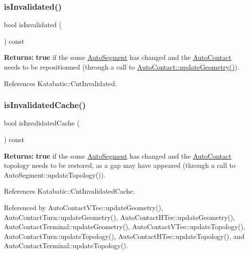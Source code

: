 \subsubsection{\texorpdfstring{is\+Invalidated()}{isInvalidated()}}
{\footnotesize\ttfamily bool is\+Invalidated (\begin{DoxyParamCaption}{ }\end{DoxyParamCaption}) const\hspace{0.3cm}{\ttfamily [inline]}}

{\bfseries Returns\+:} {\bfseries true} if the some \mbox{\hyperlink{classKatabatic_1_1AutoSegment}{Auto\+Segment}} has changed and the \mbox{\hyperlink{classKatabatic_1_1AutoContact}{Auto\+Contact}} needs to be repositionned (through a call to \mbox{\hyperlink{classKatabatic_1_1AutoContact_af6a2454547eeb7f5a519970dcb467e90}{Auto\+Contact\+::update\+Geometry()}}). 

References Katabatic\+::\+Cnt\+Invalidated.

\mbox{\label{classKatabatic_1_1AutoContact_a6d1120fc8800af5d269e72ce5c3ba629}} 
\subsubsection{\texorpdfstring{is\+Invalidated\+Cache()}{isInvalidatedCache()}}
{\footnotesize\ttfamily bool is\+Invalidated\+Cache (\begin{DoxyParamCaption}{ }\end{DoxyParamCaption}) const\hspace{0.3cm}{\ttfamily [inline]}}

{\bfseries Returns\+:} {\bfseries true} if the some \mbox{\hyperlink{classKatabatic_1_1AutoSegment}{Auto\+Segment}} has changed and the \mbox{\hyperlink{classKatabatic_1_1AutoContact}{Auto\+Contact}} topology needs to be restored, as a gap may have appeared (through a call to Auto\+Segment\+::update\+Topology()). 

References Katabatic\+::\+Cnt\+Invalidated\+Cache.



Referenced by Auto\+Contact\+V\+Tee\+::update\+Geometry(), Auto\+Contact\+Turn\+::update\+Geometry(), Auto\+Contact\+H\+Tee\+::update\+Geometry(), Auto\+Contact\+Terminal\+::update\+Geometry(), Auto\+Contact\+V\+Tee\+::update\+Topology(), Auto\+Contact\+Turn\+::update\+Topology(), Auto\+Contact\+H\+Tee\+::update\+Topology(), and Auto\+Contact\+Terminal\+::update\+Topology().

